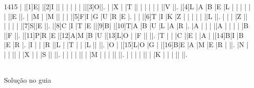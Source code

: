 \documentclass[12pt, a4paper]{article}
\begin{document}
\pagestyle{empty}

\begin{center}
\PuzzleUnitlength=16pt               %
\begin{Puzzle}{14}{15}
  |{}   |[1]E|{}   |[2]I |{}|{}  |{}   |{}   |{}  |{}   |{}  |{}|[3]O|{}|.
  |{}   |X   |{}   |T    |{}|{}  |{}   |{}   |{}  |{}   |{}  |{}|V   |{}|.
  |[4]L |A   |B    |E    |L |{}  |{}   |{}   |{}  |{}   |{}  |{}|E   |{}|.
  |{}   |M   |{}   |M    |{}|{}  |{}   |{}   |[5]F|I    |G   |U |R   |E |.
  |{}   |{}  |[6]T |I    |K |Z   |{}   |{}   |{}  |{}   |{}  |{}|L   |{}|.
  |{}   |{}  |{}   |Z    |{}|{}  |{}   |{}   |{}  |{}   |[7]S|{}|E   |{}|.
  |[8]C |I   |T    |E    |{}|[9]B|{}   |[10]T|A   |B    |U   |L |A   |R |.
  |A    |{}  |{}   |{}   |{}|A   |{}   |{}   |{}  |{}   |B   |{}|F   |{}|.
  |[11]P|R   |E    |[12]A|M |B   |U    |[13]L|O   |{}   |F   |{}|{}  |{}|.
  |T    |{}  |{}   |C    |{}|E   |{}   |A    |{}  |[14]B|I   |B |E   |R |.
  |I    |{}  |{}   |R    |{}|L   |{}   |T    |{}  |{}   |L   |{}|{}  |{}|.
  |O    |{}  |[15]L|O    |G |{}  |[16]B|E    |A   |M    |E   |R |{}  |{}|.
  |N    |{}  |{}   |{}   |{}|{}  |{}   |X    |{}  |{}   |S   |{}|{}  |{}|.
  |{}   |{}  |{}   |{}   |{}|{}  |{}   |M    |{}  |{}   |{}  |{}|{}  |{}|.
  |{}   |{}  |{}   |{}   |{}|{}  |{}   |K    |{}  |{}   |{}  |{}|{}  |{}|.
\end{Puzzle}
\qquad
\parbox[b]{2cm}{\centering   %
  \\[2pt]
  \footnotesize Solução no guia}
\end{center}
\end{document}
